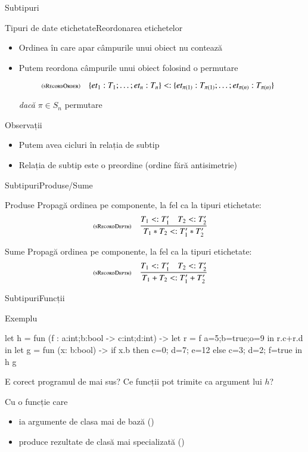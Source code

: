 \documentclass[xcolor=pdftex,romanian,colorlinks]{beamer}
\begin{document}
\begin{section}{Subtipuri}
\begin{frame}{Tipuri de date etichetate}{Reordonarea etichetelor}
\begin{itemize}
\item Ordinea în care apar câmpurile unui obiect nu contează
\item Putem reordona câmpurile unui obiect folosind o permutare
 {\small \[\reg[sRecordOrder]{\{{\it et}_1 : T_1;\ldots;{\it et}_{n}:T_{n}\} \stip \{{\it et}_{\pi(1)} : T_{\pi(1)};\ldots;{\it et}_{\pi(n)}:T_{\pi(n)}\}}{}{}\]

\hfill {\it dacă } $\pi\in S_n$ permutare}
\end{itemize}

\begin{block}{Observații}
\begin{itemize}
\item Putem avea cicluri în relația de subtip
\item Relația de subtip este o preordine (ordine fără antisimetrie)
\end{itemize}
\end{block}
\end{frame}

\begin{frame}{Subtipuri}{Produse/Sume}
\begin{block}{Produse}
Propagă ordinea pe componente, la fel ca la tipuri etichetate:
\[
\reg[sRecordDepth]{T_1 * T_{2} \stip T_1' * T_{2}'}{T_1\stip T_1'\si T_2\stip T_2'}{}
\]
\end{block}

\vfill
\begin{block}{Sume}
Propagă ordinea pe componente, la fel ca la tipuri etichetate:
\[
\reg[sRecordDepth]{T_1 + T_{2} \stip T_1' + T_{2}'}{T_1\stip T_1'\si T_2\stip T_2'}{}
\]
\end{block}
\end{frame}

\begin{frame}[fragile]{Subtipuri}{Funcții}
\begin{block}{Exemplu}
\begin{asciiml}
let h = fun (f : {a:int;b:bool} -> {c:int;d:int}) ->
     let r = f {a=5;b=true;o=9} in r.c+r.d
in let g = fun (x: {b:bool}) -> if x.b then {c=0; d=7; e=12} 
                                       else {c=3; d=2; f=true}
in h g 
\end{asciiml}
E corect programul de mai sus? Ce funcții pot trimite ca argument lui $h$? 

 Cu o funcție care 
\begin{itemize} 
\item ia argumente de clasa mai de bază ()
\item  produce rezultate de clasă mai specializată
()
\end{itemize}
\end{block}


\end{frame}
\end{section}
\end{document}
